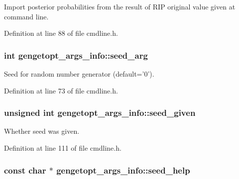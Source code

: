 Import posterior probabilities from the result of R\+I\+P original value given at command line. 



Definition at line 88 of file cmdline.\+h.

\hypertarget{structgengetopt__args__info_a607715b9c4184c391b4738d5f70512e7}{
\subsubsection[{seed\+\_\+arg}]{\setlength{\rightskip}{0pt plus 5cm}int gengetopt\+\_\+args\+\_\+info\+::seed\+\_\+arg}}\label{structgengetopt__args__info_a607715b9c4184c391b4738d5f70512e7}


Seed for random number generator (default='0'). 



Definition at line 73 of file cmdline.\+h.

\hypertarget{structgengetopt__args__info_a5628cfc09082e40b5e095f52c05098ac}{
\subsubsection[{seed\+\_\+given}]{\setlength{\rightskip}{0pt plus 5cm}unsigned int gengetopt\+\_\+args\+\_\+info\+::seed\+\_\+given}}\label{structgengetopt__args__info_a5628cfc09082e40b5e095f52c05098ac}


Whether seed was given. 



Definition at line 111 of file cmdline.\+h.

\hypertarget{structgengetopt__args__info_ab4344caee458766e8bb69c200668de97}{
\subsubsection[{seed\+\_\+help}]{\setlength{\rightskip}{0pt plus 5cm}const char $\ast$ gengetopt\+\_\+args\+\_\+info\+::seed\+\_\+help}}\label{structgengetopt__args__info_ab4344caee458766e8bb69c200668de97}


